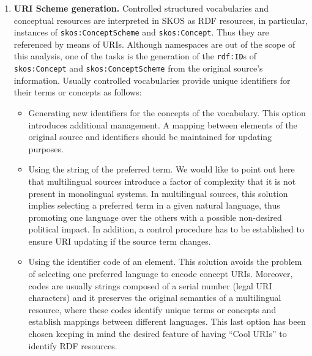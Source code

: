 \begin{enumerate}
 \item \textbf{URI Scheme generation.} Controlled structured vocabularies and conceptual resources are interpreted in SKOS as RDF 
 resources, in particular, instances of \texttt{skos:ConceptScheme} and \texttt{skos:Concept}. Thus they are referenced by 
 means of URIs.  Although namespaces are out of the scope of this analysis, one of the tasks is the generation of 
 the \texttt{rdf:ID}s of \texttt{skos:Concept} and \texttt{skos:ConceptScheme} from the original source's information. 
 Usually controlled vocabularies provide unique identifiers for their terms or concepts as follows:
 \begin{itemize}
  \item Generating new identifiers for the concepts of the vocabulary. This option introduces additional management. 
  A mapping between elements of the original source and identifiers should be maintained for updating purposes.
  \item Using the string of the preferred term. We would like to point out here that multilingual sources introduce a 
  factor of complexity that it is not present in monolingual systems. In multilingual sources, this solution 
  implies selecting a preferred term in a given natural language, thus promoting one language over the others with a 
  possible non-desired political impact. In addition, a control procedure has to be established to ensure URI updating if the source term changes.
  \item Using the identifier code of an element. This solution avoids the problem of selecting one preferred language 
  to encode concept URIs. Moreover, codes are usually strings composed of a serial number 
  (legal URI characters) and it preserves the original semantics of a multilingual resource,
  where these codes identify unique terms or concepts and establish mappings between different languages. 
  This last option has been chosen keeping in mind the desired feature of having ``Cool URIs'' to identify RDF resources.
 \end{itemize}


\end{enumerate}
